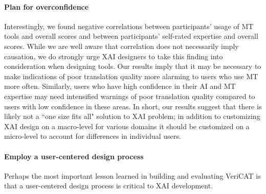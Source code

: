 \paragraph{\textbf{Plan for overconfidence}} Interestingly, we found negative correlations between participants' usage of MT tools and overall scores and between participants' self-rated expertise and overall scores. While we are well aware that correlation does not necessarily imply causation, we do strongly urge XAI designers to take this finding into consideration when designing tools. Our results imply that it may be necessary to make indications of poor translation quality more alarming to users who use MT more often. Similarly, users who have high confidence in their AI and MT expertise may need intensified warnings of poor translation quality compared to users with low confidence in these areas. In short, our results suggest that there is likely not a ``one size fits all" solution to XAI problem; in addition to customizing XAI design on a macro-level for various domains it should be customized on a micro-level to account for differences in individual users.   

\paragraph{\textbf{Employ a user-centered design process}} Perhaps the most important lesson learned in building and evaluating VeriCAT is that a user-centered design process is critical to XAI development.   


